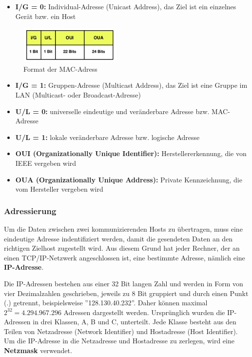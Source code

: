 \begin{itemize}
	\item \textbf{I/G = 0:} Individual-Adresse (Unicast Address), das Ziel ist ein einzelnes Gerät bzw. ein Host
\end{itemize}

\begin{figure}[htbp]
	\centering
		\includegraphics[width=190px,height=70px]{pictures/mac_adress.png}
	\caption[Format der MAC-Adress]{Format der MAC-Adress \cite{netzmafia}}\label{fig:mac_adress}
\end{figure}

\begin{itemize}
	\item \textbf{I/G = 1:} Gruppen-Adresse (Multicast Address), das Ziel ist eine Gruppe im LAN (Multicast- oder Broadcast-Adresse) 
	\item \textbf{U/L = 0:} universelle eindeutige und veränderbare Adresse bzw. MAC-Adresse
	\item \textbf{U/L = 1:} lokale veränderbare Adresse bzw. logische Adresse
	\item \textbf{OUI (Organizationally Unique Identifier):} Herstellererkennung, die von IEEE vergeben wird
	\item \textbf{OUA (Organizationally Unique Address):} Private Kennzeichnung, die vom Hersteller vergeben wird
\end{itemize}

\subsubsection{Adressierung}
Um die Daten zwischen zwei kommunizierenden Hosts zu übertragen, muss eine eindeutige Adresse indentifiziert werden, damit die gesendeten Daten an den richtigen Zielhost zugestellt wird. Aus diesem Grund hat jeder Rechner, der an einen TCP/IP-Netzwerk angeschlossen ist, eine bestimmte Adresse, nämlich eine \textbf{IP-Adresse}. \smallskip \smallskip

Die IP-Adressen bestehen aus einer 32 Bit langen Zahl und werden in Form von vier Dezimalzahlen geschrieben, jeweils zu 8 Bit gruppiert und durch einen Punkt (.) getrennt, beispielsweise ''128.130.40.232''. Daher können maximal $2^{32} = 4.294.967.296$ Adressen dargestellt werden. Ursprünglich wurden die IP-Adressen in drei Klassen, A, B und C, unterteilt. Jede Klasse besteht aus den Teilen von Netzadresse (Network Identifier) und Hostadresse (Host Identifier). Um die IP-Adresse in die Netzadresse und Hostadresse zu zerlegen, wird eine \textbf{Netzmask} verwendet. %

